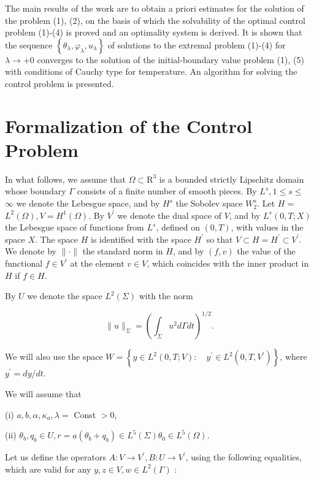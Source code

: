 \documentclass[10pt]{article}
\begin{document}
The main results of the work are to obtain a priori estimates for the solution of the problem (1), (2), on the basis of which the solvability of the optimal control problem (1)-(4) is proved and an optimality system is derived. It is shown that the sequence $\left\{\theta_{\lambda}, \varphi_{\lambda}, u_{\lambda}\right\}$ of solutions to the extremal problem (1)-(4) for $\lambda \rightarrow+0$ converges to the solution of the initial-boundary value problem (1), (5) with conditions of Cauchy type for temperature. An algorithm for solving the control problem is presented.

\section{Formalization of the Control Problem}
In what follows, we assume that $\Omega \subset \mathrm{R}^{3}$ is a bounded strictly Lipschitz domain whose boundary $\Gamma$ consists of a finite number of smooth pieces. By $L^{s}, 1 \leq s \leq$ $\infty$ we denote the Lebesgue space, and by $H^{s}$ the Sobolev space $W_{2}^{s}$. Let $H=$ $L^{2}(\Omega), V=H^{1}(\Omega)$. By $V^{\prime}$ we denote the dual space of $V$, and by $L^{s}(0, T ; X)$ the Lebesgue space of functions from $L^{s}$, defined on $(0, T)$, with values in the space $X$. The space $H$ is identified with the space $H^{\prime}$ so that $V \subset H=H^{\prime} \subset V^{\prime}$. We denote by $\|\cdot\|$ the standard norm in $H$, and by $(f, v)$ the value of the functional $f \in V^{\prime}$ at the element $v \in V$, which coincides with the inner product in $H$ if $f \in H$.

By $U$ we denote the space $L^{2}(\Sigma)$ with the norm

$$
\|u\|_{\Sigma}=\left(\int_{\Sigma} u^{2} d \Gamma d t\right)^{1 / 2} .
$$

We will also use the space $W=\left\{y \in L^{2}(0, T ; V): \quad y^{\prime} \in L^{2}\left(0, T, V^{\prime}\right)\right\}$, where $y^{\prime}=d y / d t$.

We will assume that

(i) $a, b, \alpha, \kappa_{a}, \lambda=$ Const $>0$,

(ii) $\theta_{b}, q_{b} \in U, r=a\left(\theta_{b}+q_{b}\right) \in L^{5}(\Sigma) \theta_{0} \in L^{5}(\Omega)$.

Let us define the operators $A: V \rightarrow V^{\prime}, B: U \rightarrow V^{\prime}$, using the following equalities, which are valid for any $y, z \in V, w \in L^{2}(\Gamma)$ :
\end{document}
